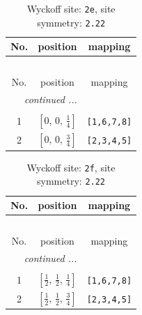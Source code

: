 \documentclass[fleqn,8pt]{jsarticle}
\begin{document}
\begin{longtable}{ccc}
\caption{Wyckoff site: {\tt 2e}, site symmetry: {\tt 2.22}}
 \\
 \hline \hline
No. & position & mapping \\ \hline \endfirsthead

\multicolumn{2}{l}{\tablename\ \thetable{}} \\
 \hline \hline
No. & position & mapping \\ \hline \endhead

 \hline \hline
\multicolumn{2}{r}{\footnotesize\it continued ...} \\ \endfoot

 \hline \hline
\multicolumn{2}{r}{} \\ \endlastfoot

1 & $\left[ 0,\, 0,\, \frac{1}{4} \right]$ & {\tt [1,6,7,8]} \\ \hline
2 & $\left[ 0,\, 0,\, \frac{3}{4} \right]$ & {\tt [2,3,4,5]} \\
\end{longtable}
\renewcommand{\arraystretch}{1.2}
\begin{longtable}{ccc}
\caption{Wyckoff site: {\tt 2f}, site symmetry: {\tt 2.22}}
 \\
 \hline \hline
No. & position & mapping \\ \hline \endfirsthead

\multicolumn{2}{l}{\tablename\ \thetable{}} \\
 \hline \hline
No. & position & mapping \\ \hline \endhead

 \hline \hline
\multicolumn{2}{r}{\footnotesize\it continued ...} \\ \endfoot

 \hline \hline
\multicolumn{2}{r}{} \\ \endlastfoot

1 & $\left[ \frac{1}{2},\, \frac{1}{2},\, \frac{1}{4} \right]$ & {\tt [1,6,7,8]} \\ \hline
2 & $\left[ \frac{1}{2},\, \frac{1}{2},\, \frac{3}{4} \right]$ & {\tt [2,3,4,5]} \\
\end{longtable}
\renewcommand{\arraystretch}{1.2}
\end{document}
